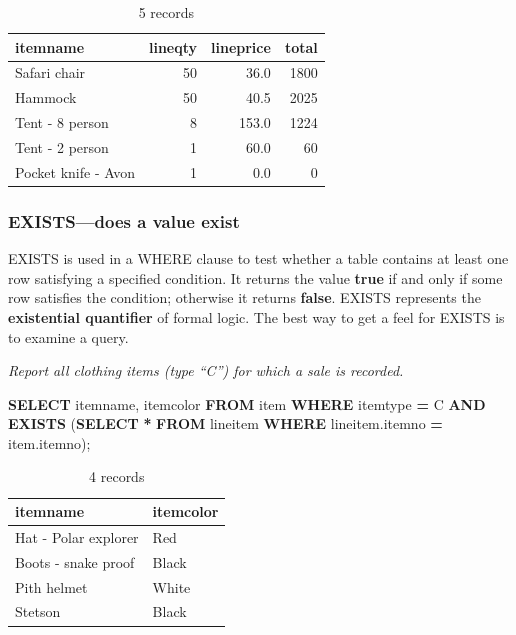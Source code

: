 \documentclass[
]{article}
\newenvironment{Shaded}{\begin{snugshade}}{\end{snugshade}}
\newcommand{\KeywordTok}[1]{\textcolor[rgb]{0.13,0.29,0.53}{\textbf{#1}}}
\newcommand{\NormalTok}[1]{#1}
\newcommand{\OperatorTok}[1]{\textcolor[rgb]{0.81,0.36,0.00}{\textbf{#1}}}
\newcommand{\StringTok}[1]{\textcolor[rgb]{0.31,0.60,0.02}{#1}}
\begin{document}
\begin{table}

\caption{\label{tab:unnamed-chunk-63}5 records}
\centering
\begin{tabular}[t]{l|r|r|r}
\hline
itemname & lineqty & lineprice & total\\
\hline
Safari chair & 50 & 36.0 & 1800\\
\hline
Hammock & 50 & 40.5 & 2025\\
\hline
Tent - 8 person & 8 & 153.0 & 1224\\
\hline
Tent - 2 person & 1 & 60.0 & 60\\
\hline
Pocket knife - Avon & 1 & 0.0 & 0\\
\hline
\end{tabular}
\end{table}

\hypertarget{existsdoes-a-value-exist}{%
\subsubsection*{EXISTS---does a value exist}\label{existsdoes-a-value-exist}}

EXISTS is used in a WHERE clause to test whether a table contains at least one row satisfying a specified condition. It returns the value \textbf{true} if and only if some row satisfies the condition; otherwise it returns \textbf{false}. EXISTS represents the \textbf{existential quantifier} of formal logic. The best way to get a feel for EXISTS is to examine a query.

\emph{Report all clothing items (type ``C'') for which a sale is recorded.}

\begin{Shaded}
\begin{Highlighting}[]
\KeywordTok{SELECT}\NormalTok{ itemname, itemcolor }\KeywordTok{FROM}\NormalTok{ item}
    \KeywordTok{WHERE}\NormalTok{ itemtype }\OperatorTok{=} \StringTok{\textquotesingle{}C\textquotesingle{}}
    \KeywordTok{AND} \KeywordTok{EXISTS}\NormalTok{ (}\KeywordTok{SELECT} \OperatorTok{*} \KeywordTok{FROM}\NormalTok{ lineitem}
        \KeywordTok{WHERE}\NormalTok{ lineitem.itemno }\OperatorTok{=}\NormalTok{ item.itemno);}
\end{Highlighting}
\end{Shaded}

\begin{table}

\caption{\label{tab:unnamed-chunk-64}4 records}
\centering
\begin{tabular}[t]{l|l}
\hline
itemname & itemcolor\\
\hline
Hat - Polar explorer & Red\\
\hline
Boots - snake proof & Black\\
\hline
Pith helmet & White\\
\hline
Stetson & Black\\
\hline
\end{tabular}
\end{table}
\end{document}
